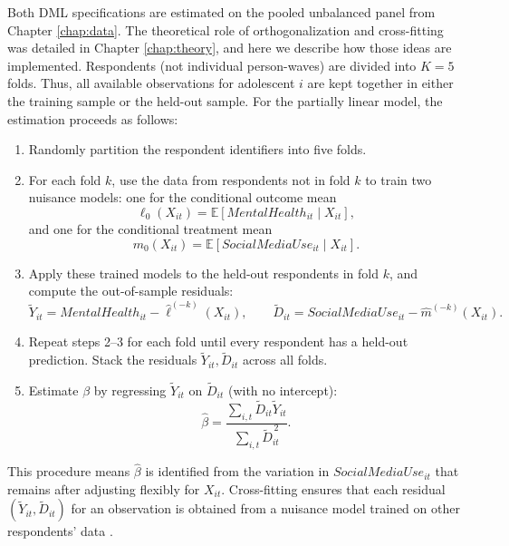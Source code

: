\documentclass[11pt,oneside,a4paper]{book}
\begin{document}
Both DML specifications are estimated on the pooled unbalanced panel from Chapter \ref{chap:data}. The theoretical role of orthogonalization and cross-fitting was detailed in Chapter \ref{chap:theory}, and here we describe how those ideas are implemented. Respondents (not individual person-waves) are divided into \(K=5\) folds. Thus, all available observations for adolescent \(i\) are kept together in either the training sample or the held-out sample.  For the partially linear model, the estimation proceeds as follows:
\begin{enumerate}
\item Randomly partition the respondent identifiers into five folds.
\item For each fold \(k\), use the data from respondents not in fold \(k\) to train two nuisance models: one for the conditional outcome mean \[
    \ell_0(X_{it}) = \mathbb{E}[MentalHealth_{it}\mid X_{it}],
  \] 
  and one for the conditional treatment mean 
  \[
    m_0(X_{it}) = \mathbb{E}[SocialMediaUse_{it}\mid X_{it}].
  \]
\item Apply these trained models to the held-out respondents in fold \(k\), and compute the out-of-sample residuals:
\begin{equation*}
\widetilde{Y}_{it}
=
MentalHealth_{it}-\widehat{\ell}^{(-k)}(X_{it}),
\qquad
\widetilde{D}_{it}
=
SocialMediaUse_{it}-\widehat{m}^{(-k)}(X_{it}).
\end{equation*}
\item Repeat steps 2–3 for each fold until every respondent has a held-out prediction. Stack the residuals \(\widetilde{Y}_{it}, \widetilde{D}_{it}\) across all folds.
\item Estimate \(\beta\) by regressing \(\widetilde{Y}_{it}\) on \(\widetilde{D}_{it}\) (with no intercept):
\begin{equation*}
\widehat{\beta}
=
\frac{\sum_{i,t}\widetilde{D}_{it}\widetilde{Y}_{it}}
{\sum_{i,t}\widetilde{D}_{it}^{\,2}}.
\end{equation*}
\end{enumerate}
This procedure means \(\widehat{\beta}\) is identified from the variation in \(SocialMediaUse_{it}\) that remains after adjusting flexibly for \(X_{it}\). Cross-fitting ensures that each residual \((\widetilde{Y}_{it},\widetilde{D}_{it})\) for an observation is obtained from a nuisance model trained on other respondents’ data \citep{chernozhukov2018dml,knaus2021musicdml,bach2024doubleml}.
\end{document}
